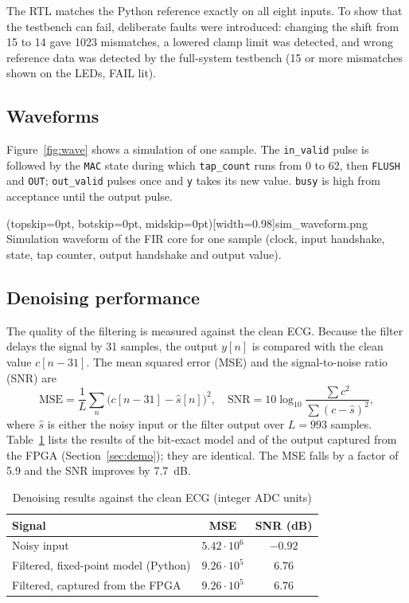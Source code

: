 \documentclass{ieeeaccess}
\begin{document}
The RTL matches the Python reference exactly on all eight inputs. To show that the testbench can fail, deliberate faults were introduced: changing the shift from 15 to 14 gave 1023 mismatches, a lowered clamp limit was detected, and wrong reference data was detected by the full-system testbench (15 or more mismatches shown on the LEDs, FAIL lit).

\subsection{Waveforms}
Figure~\ref{fig:wave} shows a simulation of one sample. The \texttt{in\_valid} pulse is followed by the \texttt{MAC} state during which \texttt{tap\_count} runs from 0 to 62, then \texttt{FLUSH} and \texttt{OUT}; \texttt{out\_valid} pulses once and \texttt{y} takes its new value. \texttt{busy} is high from acceptance until the output pulse.

\Figure[t!](topskip=0pt, botskip=0pt, midskip=0pt)[width=0.98\columnwidth]{sim_waveform.png}
{Simulation waveform of the FIR core for one sample (clock, input handshake, state, tap counter, output handshake and output value).\label{fig:wave}}

\subsection{Denoising performance}
The quality of the filtering is measured against the clean ECG. Because the filter delays the signal by 31 samples, the output $y[n]$ is compared with the clean value $c[n-31]$. The mean squared error (MSE) and the signal-to-noise ratio (SNR) are
\begin{equation}
\mathrm{MSE}=\frac{1}{L}\sum_n \big(c[n-31]-\hat{s}[n]\big)^2,\quad
\mathrm{SNR}=10\log_{10}\frac{\sum c^2}{\sum (c-\hat{s})^2},
\end{equation}
where $\hat s$ is either the noisy input or the filter output over $L=993$ samples. Table~\ref{tab:metrics} lists the results of the bit-exact model and of the output captured from the FPGA (Section~\ref{sec:demo}); they are identical. The MSE falls by a factor of 5.9 and the SNR improves by 7.7~dB.

\begin{table}[!t]
\caption{Denoising results against the clean ECG (integer ADC units)}
\label{tab:metrics}
\centering
\begin{tabular}{lcc}
\toprule
Signal & MSE & SNR (dB) \\
\midrule
Noisy input & $5.42\cdot10^{6}$ & $-0.92$ \\
Filtered, fixed-point model (Python) & $9.26\cdot10^{5}$ & $6.76$ \\
Filtered, captured from the FPGA & $9.26\cdot10^{5}$ & $6.76$ \\
\bottomrule
\end{tabular}
\end{table}
\end{document}
